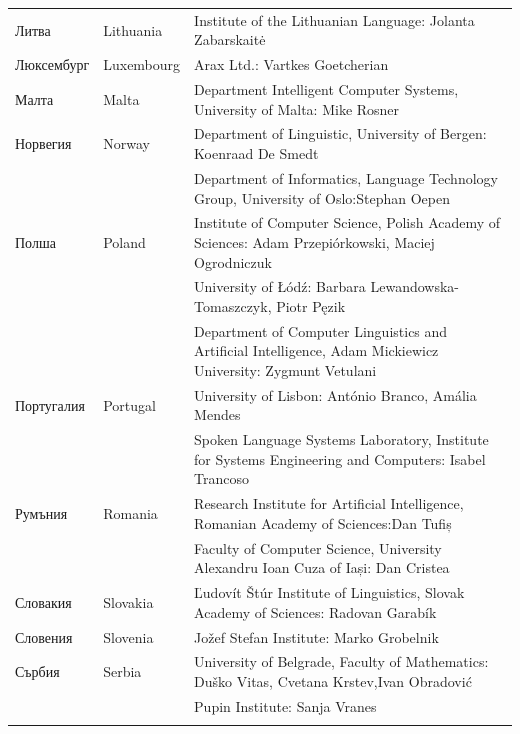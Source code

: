 \documentclass[]{../../metanetpaper}
\begin{document}
\begin{longtable}{@{}llp{110mm}@{}}
  Литва & \textcolor{grey1}{Lithuania} & Institute of the Lithuanian Language: Jolanta Zabarskaitė\\ \addlinespace
  Люксембург & \textcolor{grey1}{Luxembourg} & Arax Ltd.: Vartkes Goetcherian\\ \addlinespace
  Малта & \textcolor{grey1}{Malta} & Department Intelligent Computer Systems, University of Malta: Mike Rosner\\ \addlinespace
  Норвегия & \textcolor{grey1}{Norway} & Department of Linguistic, University of Bergen: Koenraad De Smedt\\ \addlinespace 
  & & Department of Informatics, Language Technology Group, University of Oslo:\newline Stephan Oepen \\ \addlinespace
  Полша & \textcolor{grey1}{Poland} & Institute of Computer Science, Polish Academy of Sciences: Adam Przepiórkowski, Maciej Ogrodniczuk \\ \addlinespace
  & & University of Łódź: Barbara Lewandowska-Tomaszczyk, Piotr Pęzik\\ \addlinespace
  & & Department of Computer Linguistics and Artificial Intelligence, Adam Mickiewicz University: Zygmunt Vetulani \\ \addlinespace
  Португалия & \textcolor{grey1}{Portugal} & University of Lisbon: António Branco, Amália Mendes \\ \addlinespace
  & & Spoken Language Systems Laboratory, Institute for Systems Engineering and Computers: Isabel Trancoso \\ \addlinespace
  Румъния & \textcolor{grey1}{Romania} & Research Institute for Artificial Intelligence, Romanian Academy of Sciences:\newline Dan Tufiș \\ \addlinespace
  & & Faculty of Computer Science, University Alexandru Ioan Cuza of
  Iași: Dan Cristea \\ \addlinespace
  Словакия & \textcolor{grey1}{Slovakia} & Ľudovít Štúr Institute of Linguistics, Slovak Academy of Sciences: Radovan Garabík \\ \addlinespace 
  Словения & \textcolor{grey1}{Slovenia} & Jožef Stefan Institute: Marko Grobelnik \\ \addlinespace 
  Сърбия & \textcolor{grey1}{Serbia} & University of Belgrade, Faculty of Mathematics: Duško Vitas, Cvetana Krstev,\newline Ivan Obradović \\ \addlinespace
  & & Pupin Institute: Sanja Vranes \\ \addlinespace  

\end{longtable}
\end{document}
